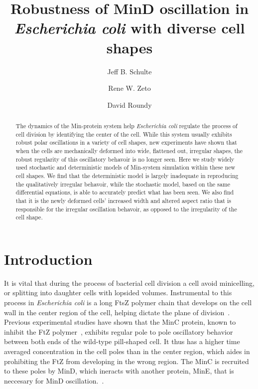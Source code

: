 \documentclass[letterpaper,twocolumn,amsmath,amssymb,pre]{revtex4-1}
\newcommand{\red}[1]{{\bf \color{red} #1}}
\newcommand{\fixme}[1]{\red{[#1]}}
\begin{document}
\title{Robustness of MinD oscillation in \emph{Escherichia coli} with
  diverse cell shapes}

\author{Jeff B. Schulte}
\author{Rene W. Zeto}
\author{David Roundy}

\begin{abstract}
  The dynamics of the Min-protein system help \emph{Escherichia coli}
  regulate the process of cell division by identifying the center of
  the cell.  While this system usually exhibits robust polar
  oscillations in a variety of cell shapes, new experiments have shown
  that when the cells are mechanically deformed into wide, flattened
  out, irregular shapes, the robust regularity of this oscillatory
  behavoir is no longer seen. Here we study widely used stochastic and
  deterministic models of Min-system simulation within these new cell
  shapes.  We find that the deterministic model is largely inadequate
  in reproducing the qualitatively irregular behavoir, while the
  stochastic model, based on the same differential equations, is able
  to accurately predict what has been seen.  We also find that it is
  the newly deformed cells' increased width and altered aspect ratio
  that is responsible for the irregular oscillation behavoir, as
  opposed to the irregularity of the cell shape.
\end{abstract}

\maketitle

\section{Introduction}
It is vital that during the process of bacterial cell division a cell
avoid minicelling, or splitting into daughter cells with lopsided
volumes.  Instrumental to this process in \emph{Escherichia coli} is a
long FtsZ polymer chain that develops on the cell wall in the center
region of the cell, helping dictate the plane of
division~\cite{adams2009bacterial, lutkenhaus2007assembly}. Previous
experimental studies have shown that the MinC protein, known to
inhibit the FtZ polymer~\cite{shen2010examination}, exhibits regular
pole to pole oscillatory behavior between both ends of the wild-type
pill-shaped cell.  It thus has a higher time averaged concentration in
the cell poles than in the center region, which aides in prohibiting
the FtZ from developing in the wrong region.  The MinC is recruited to
these poles by MinD, which ineracts with another protein, MinE, that
is neccesary for MinD oscillation.~\cite{hu1999topological,
  fu2001mine, shapiro2009and, yu1999ftsz, raskin1999rapid,
  meacci2005min, raskin1999minde}.
\end{document}
